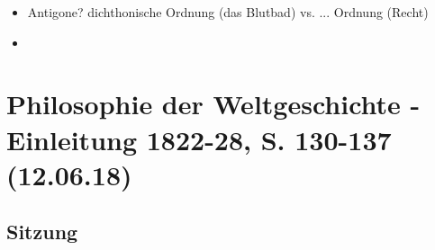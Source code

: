 \documentclass[emulatestandardclasses]{scrartcl}
\begin{document}
\begin{itemize}
  \item Antigone? dichthonische Ordnung (das Blutbad) vs. ... Ordnung (Recht)
  \item 
\end{itemize}



\section{Philosophie der Weltgeschichte - Einleitung 1822-28, S. 130-137\\(12.06.18)}

\subsection{Sitzung}
\end{document}
